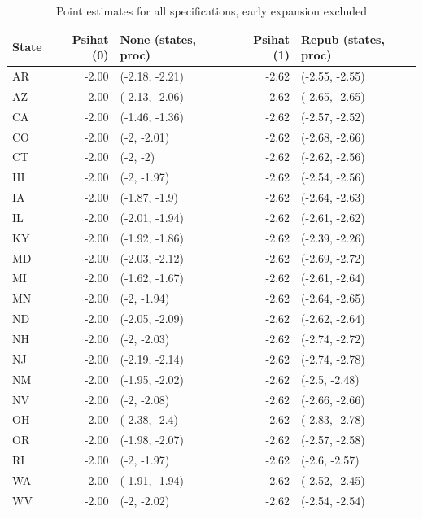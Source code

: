 \documentclass[12pt]{article}
\begin{document}
\begin{table}[ht]
\centering
\begin{tabular}{lrlrl}
  \toprule
State & Psihat (0) & None (states, proc) & Psihat (1) & Repub (states, proc) \\ 
  \midrule
AR & -2.00 & (-2.18, -2.21) & -2.62 & (-2.55, -2.55) \\ 
  AZ & -2.00 & (-2.13, -2.06) & -2.62 & (-2.65, -2.65) \\ 
  CA & -2.00 & (-1.46, -1.36) & -2.62 & (-2.57, -2.52) \\ 
  CO & -2.00 & (-2, -2.01) & -2.62 & (-2.68, -2.66) \\ 
  CT & -2.00 & (-2, -2) & -2.62 & (-2.62, -2.56) \\ 
  HI & -2.00 & (-2, -1.97) & -2.62 & (-2.54, -2.56) \\ 
  IA & -2.00 & (-1.87, -1.9) & -2.62 & (-2.64, -2.63) \\ 
  IL & -2.00 & (-2.01, -1.94) & -2.62 & (-2.61, -2.62) \\ 
  KY & -2.00 & (-1.92, -1.86) & -2.62 & (-2.39, -2.26) \\ 
  MD & -2.00 & (-2.03, -2.12) & -2.62 & (-2.69, -2.72) \\ 
  MI & -2.00 & (-1.62, -1.67) & -2.62 & (-2.61, -2.64) \\ 
  MN & -2.00 & (-2, -1.94) & -2.62 & (-2.64, -2.65) \\ 
  ND & -2.00 & (-2.05, -2.09) & -2.62 & (-2.62, -2.64) \\ 
  NH & -2.00 & (-2, -2.03) & -2.62 & (-2.74, -2.72) \\ 
  NJ & -2.00 & (-2.19, -2.14) & -2.62 & (-2.74, -2.78) \\ 
  NM & -2.00 & (-1.95, -2.02) & -2.62 & (-2.5, -2.48) \\ 
  NV & -2.00 & (-2, -2.08) & -2.62 & (-2.66, -2.66) \\ 
  OH & -2.00 & (-2.38, -2.4) & -2.62 & (-2.83, -2.78) \\ 
  OR & -2.00 & (-1.98, -2.07) & -2.62 & (-2.57, -2.58) \\ 
  RI & -2.00 & (-2, -1.97) & -2.62 & (-2.6, -2.57) \\ 
  WA & -2.00 & (-1.91, -1.94) & -2.62 & (-2.52, -2.45) \\ 
  WV & -2.00 & (-2, -2.02) & -2.62 & (-2.54, -2.54) \\ 
   \bottomrule
\end{tabular}
   \caption{Point estimates for all specifications, early expansion excluded}
    \label{tab:sensitivityc1}
\end{table}
\end{document}
